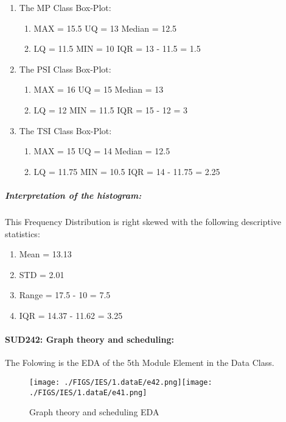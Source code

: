 \documentclass[12pt]{extreport}
\begin{document}
\begin{enumerate}	
	\item The MP Class Box-Plot:
	\begin{enumerate}
		\item MAX = 15.5 {} {} {} {} {} {} {} {} UQ = 13   {} {} {} {} {} {} {} {} Median = 12.5 
		\item LQ = 11.5 {} {} {} {} {} {} {} {}	 MIN = 10 {} {} {} {} {} {} {} {} IQR = 13 - 11.5 = 1.5
	\end{enumerate}
	\item The PSI Class Box-Plot:
	\begin{enumerate}
		\item MAX = 16 {} {} {} {} {} {} {} {} UQ = 15 {} {} {} {} {} {} {} {} Median = 13
		\item LQ = 12 {} {} {} {} {} {} {} {}	MIN = 11.5 {} {} {} {} {} {} {} {} IQR = 15 - 12 = 3	
	\end{enumerate}
	\item The TSI Class Box-Plot:
	\begin{enumerate}
		\item MAX = 15 {} {} {} {} {} {} {} {} UQ = 14 {} {} {} {} {} {} {} {} Median = 12.5 				
		\item LQ = 11.75 {} {} {} {} {} {} {} {} MIN =	10.5 {} {} {} {} {} {} {} {} IQR = 14 - 11.75 = 2.25			
	\end{enumerate}
\end{enumerate}

\subparagraph{Interpretation of the histogram:\\
}
This Frequency Distribution is right skewed with the following descriptive statistics:

\begin{enumerate}
	\item Mean = 13.13
	\item STD = 2.01
	\item Range = 17.5 - 10 = 7.5
	\item IQR = 14.37 - 11.62 = 3.25
\end{enumerate}



\paragraph{\large SUD242: Graph theory and scheduling:\\
}
The Folowing is the EDA of the 5th Module Element in the Data Class.

\begin{figure}[H]
	\centering
	\texttt{[image: ./FIGS/IES/1.dataE/e42.png]}\texttt{[image: ./FIGS/IES/1.dataE/e41.png]}
	\caption{Graph theory and scheduling EDA}
	\label{fig:10}
\end{figure}
\end{document}
